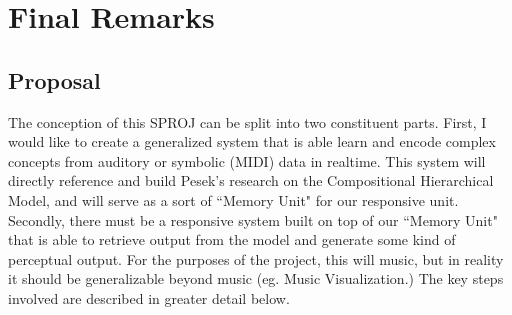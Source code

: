 \documentclass[../main.tex]{subfiles}
\begin{document}
\newpage
\section{Final Remarks}

\subsection{Proposal}
The conception of this SPROJ can be split into two constituent parts. First, I would like to create a generalized system that is able learn and encode complex concepts from auditory or symbolic (MIDI) data in realtime. This system will directly reference and build Pesek's research on the Compositional Hierarchical Model, and will serve as a sort of ``Memory Unit" for our responsive unit. Secondly, there must be a responsive system built on top of our ``Memory Unit" that is able to retrieve output from the model and generate some kind of perceptual output. For the purposes of the project, this will music, but in reality it should be generalizable beyond music (eg. Music Visualization.) The key steps involved are described in greater detail below.
\end{document}
